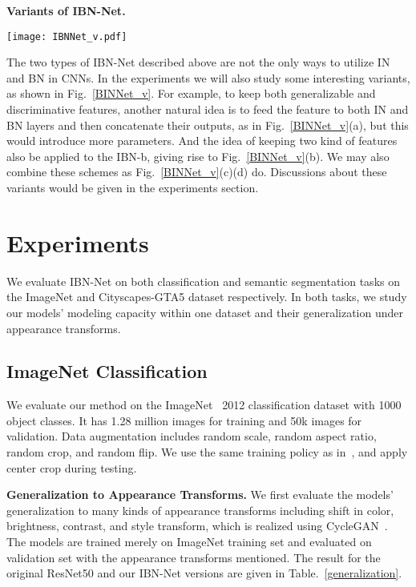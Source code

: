 \documentclass[runningheads]{llncs}
\begin{document}
\textbf{Variants of IBN-Net.}

\begin{figure*}[!t]
\centering
\texttt{[image: IBNNet\_v.pdf]}
\caption{\label{BINNet_v} Variants of IBN block. }
\end{figure*}

The two types of IBN-Net described above are not the only ways to utilize IN and BN in CNNs.
In the experiments we will also study some interesting variants, as shown in Fig.~\ref{BINNet_v}.
For example, to keep both generalizable and discriminative features, another natural idea is to feed the feature to both IN and BN layers and then concatenate their outputs, as in Fig.~\ref{BINNet_v}(a), but this would introduce more parameters. 
And the idea of keeping two kind of features also be applied to the IBN-b, giving rise to Fig.~\ref{BINNet_v}(b).
We may also combine these schemes as Fig.~\ref{BINNet_v}(c)(d) do.
Discussions about these variants would be given in the experiments section.


\section{Experiments}

We evaluate IBN-Net on both classification and semantic segmentation tasks on the ImageNet and Cityscapes-GTA5 dataset respectively.
In both tasks, we study our models' modeling capacity within one dataset and their generalization under appearance transforms.

\subsection{ImageNet Classification}

We evaluate our method on the ImageNet~\cite{deng2009imagenet} 2012 classification dataset with 1000 object classes.
It has 1.28 million images for training and 50k images for validation.
Data augmentation includes random scale, random aspect ratio, random crop, and random flip.
We use the same training policy as in~\cite{gross2016training}, and apply  center crop during testing.

\textbf{Generalization to Appearance Transforms.}
We first evaluate the models' generalization to many kinds of appearance transforms including shift in color, brightness, contrast, and style transform, which is realized using CycleGAN~\cite{zhu2017unpaired}. 
The models are trained merely on ImageNet training set and evaluated on validation set with the appearance transforms mentioned.
The result for the original ResNet50 and our IBN-Net versions are given in Table.~\ref{generalization}.
\end{document}
